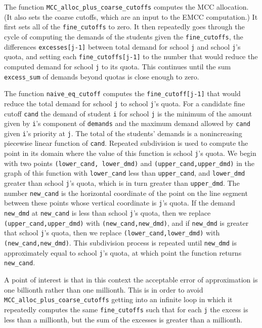 \documentclass[12pt]{article}
\theoremstyle{definition}
\begin{document}
\begin{appendix}
The function \texttt{MCC\_alloc\_plus\_coarse\_cutoffs} computes the
MCC allocation.  (It also sets the coarse cutoffs, which are an input
to the EMCC computation.)  It first sets all of the
\texttt{fine\_cutoffs} to zero.  It then repeatedly goes through the
cycle of computing the demands of the students given the
\texttt{fine\_cutoffs}, the differences \texttt{excesses[j-1]} between
total demand for school \texttt{j} and school \texttt{j}'s quota, and
setting each \texttt{fine\_cutoffs[j-1]} to the number that would
reduce the computed demand for school \texttt{j} to its quota.  This
continues until the sum \texttt{excess\_sum} of demands beyond quotas
is close enough to zero.

The function \texttt{naive\_eq\_cutoff} computes the
\texttt{fine\_cutoff[j-1]} that would reduce the total demand for
school \texttt{j} to school \texttt{j}'s quota.  For a candidate fine
cutoff \texttt{cand} the demand of student \texttt{i} for school
\texttt{j} is the minimum of the amount given by \texttt{i}'s
component of \texttt{demands} and the maximum demand allowed by
\texttt{cand} given \texttt{i}'s priority at \texttt{j}.  The total of
the students' demands is a nonincreasing piecewise linear function of
\texttt{cand}.  Repeated subdivision is used to compute the point in
its domain where the value of this function is school \texttt{j}'s
quota.  We begin with two points \texttt{(lower\_cand, lower\_dmd)}
and \texttt{(upper\_cand,upper\_dmd)} in the graph of this function
with \texttt{lower\_cand} less than \texttt{upper\_cand}, and
\texttt{lower\_dmd} greater than school \texttt{j}'s quota, which is
in turn greater than \texttt{upper\_dmd}.  The number
\texttt{new\_cand} is the horizontal coordinate of the point on the
line segment between these points whose vertical coordinate is
\texttt{j}'s quota.  If the demand \texttt{new\_dmd} at
\texttt{new\_cand} is less than school \texttt{j}'s quota, then we
replace \texttt{(upper\_cand,upper\_dmd)} with
\texttt{(new\_cand,new\_dmd)}, and if \texttt{new\_dmd} is greater
that school \texttt{j}'s quota, then we replace
\texttt{(lower\_cand,lower\_dmd)} with \texttt{(new\_cand,new\_dmd)}.
This subdivision process is repeated until \texttt{new\_dmd} is
approximately equal to school \texttt{j}'s quota, at which point the
function returns \texttt{new\_cand}.

A point of interest is that in this context the acceptable error of
approximation is one billionth rather than one millionth.  This is in
order to avoid \texttt{MCC\_alloc\_plus\_coarse\_cutoffs} getting into
an infinite loop in which it repeatedly computes the same
\texttt{fine\_cutoffs} such that for each \texttt{j} the excess is
less than a millionth, but the sum of the excesses is greater than a
millionth.


\end{appendix}
\end{document}
